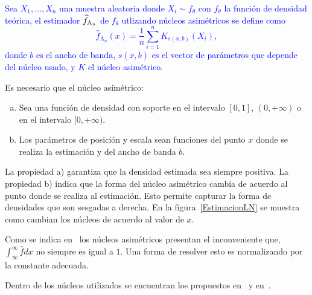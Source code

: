\textcolor{blue}{
\begin{definition}
Sea $X_1, \ldots, X_n$ una muestra aleatoria donde $X_i \sim f_{\theta}$ con $f_{\theta}$ la función de densidad teórica, el estimador $\widehat{f}_{\tiny\text{A}_n}$ de $f_{\theta}$ utlizando núcleos asimétricos se define como 
\begin{equation}
\widehat{f}_{\text{A}_n}(x)=\frac{1}{n}\sum_{i=1}^n K_{s(x,b)}(X_i),
\label{fn}
\end{equation}
donde  $b$ es el ancho de banda, $s(x,b)$ es el vector de parámetros que depende del núcleo usado, y $K$ el núcleo asimétrico.
\end{definition}
}
Es necesario que el núcleo asímétrico:

\begin{enumerate}[a)]
	\item Sea una función de densidad con soporte en el intervalo $[0,1]$, $(0,+\infty)$ o en el intervalo $[0,+\infty).$
	\item Los parámetros de posición y escala sean funciones del punto $x$ donde se realiza la estimación y del ancho de banda $b$.
\end{enumerate}
La propiedad a) garantiza que la densidad estimada sea siempre positiva. La propiedad b) indica que la forma del núcleo asimétrico cambia de acuerdo al punto donde se realiza al estimación. Esto permite capturar la forma de densidades que son sesgadas a derecha. En la figura~\ref{EstimacionLN} se muestra como cambian los núcleos de acuerdo al valor de $x$.

Como se indica en~\cite{Libnegue2013,Hirukawa2018} los núcleos asimétricos presentan el inconveniente que, $\int_{\infty}^{\infty} \widehat{f} dx$ no siempre es igual a $1$. Una forma de resolver esto es normalizando por la constante adecuada.

Dentro de los núcleos utilizados se encuentran los propuestos en~\cite{bouezmarni2005} y en~\cite{Libnegue2013}. 

